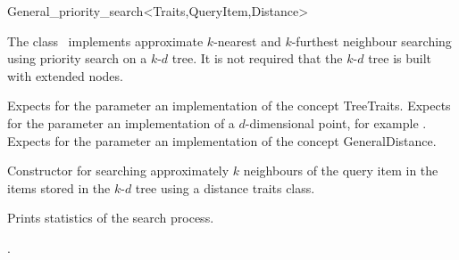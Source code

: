

\begin{ccRefClass}{General_priority_search<Traits,QueryItem,Distance>}  %


\ccDefinition

The class \ccRefName\ implements approximate $k$-nearest and $k$-furthest neighbour searching
using priority search on a $k$-$d$ tree. It is not required that the $k$-$d$ tree is
built with extended nodes.



\ccParameters

Expects for the parameter  an implementation of the concept TreeTraits.
Expects for the parameter   an implementation  
of a $d$-dimensional point, for example .
Expects for the parameter  an implementation of the
concept GeneralDistance.

\ccTypes



\ccCreation
{}  %

{Constructor for searching approximately $k$ neighbours of the query item 
in the items stored in the $k$-$d$ tree  using a distance
traits class.}




{
Prints statistics of the search process.
}

\ccSeeAlso

.


\end{ccRefClass}


